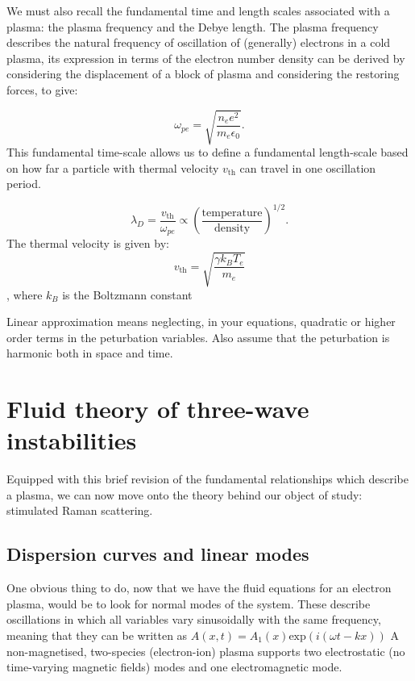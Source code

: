 We must also recall the fundamental time and length scales associated with a plasma: the plasma frequency and the Debye length. The plasma frequency describes the natural frequency of oscillation of (generally) electrons in a cold plasma, its expression in terms of the electron number density can be derived by considering the displacement of a block of plasma and considering the restoring forces, to give:

\begin{equation}
	\omega_{pe} = \sqrt{\frac{n_e e^2}{m_e \epsilon_0}}.
\end{equation} This fundamental time-scale allows us to define a fundamental length-scale based on how far a particle with thermal velocity $v_{\text{th}}$ can travel in one oscillation period.

\begin{equation}
	\lambda_D = \frac{v_{\mathrm{th}}}{\omega_{pe}} \propto \left(\frac{\mathrm{temperature}}{\mathrm{density}}\right)^{1/2}.
\end{equation}\label{eqn:debye} The thermal velocity is given by:
\begin{equation}
	v_{\text{th}} = \sqrt{\frac{\gamma k_BT_e}{m_e}}
\end{equation}\label{eqn:vth}, where $k_B$ is the Boltzmann constant

Linear approximation means neglecting, in your equations, quadratic or higher order terms in the peturbation variables. Also assume that the peturbation is harmonic both in space and time.
\section{Fluid theory of three-wave instabilities}
Equipped with this brief revision of the fundamental relationships which describe a plasma, we can now move onto the theory behind our object of study: stimulated Raman scattering.

\subsection{Dispersion curves and linear modes}

One obvious thing to do, now that we have the fluid equations for an electron plasma, would be to look for normal modes of the system. These describe oscillations in which all variables vary sinusoidally with the same frequency, meaning that they can be written as $A(x,t) = A_1(x)\text{exp}(i(\omega t - kx))$
A non-magnetised, two-species (electron-ion) plasma supports two electrostatic (no time-varying magnetic fields) modes and one electromagnetic mode. 

